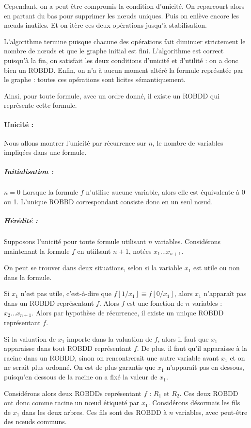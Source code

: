 \documentclass[12pt]{article}
\begin{document}
Cependant, on a peut être compromis la condition d'unicité. On reparcourt alors en partant du bas pour supprimer les n\oe uds uniques. Puis on enlève encore les n\oe uds inutiles. Et on itère ces deux opérations jusqu'à stabilisation.

L'algorithme termine puisque chacune des opérations fait diminuer strictement le nombre de n\oe uds et que le graphe initial est fini.
L'algorithme est correct puisqu'à la fin, on satisfait les deux conditions d'unicité et d'utilité : on a donc bien un ROBDD. Enfin, on n'a à aucun moment altéré la formule représntée par le graphe : toutes ces opérations sont licites sémantiquement. %

Ainsi, pour toute formule, avec un ordre donné, il existe un ROBDD qui représente cette formule.

\paragraph{Unicité :}
Nous allons montrer l'unicité par récurrence sur $n$, le nombre de variables impliqées dans une formule.

\subparagraph{Initialisation :}
$n = 0$ Lorsque la formule $f$ n'utilise aucune variable, alors elle est équivalente à 0 ou 1. L'unique ROBBD correspondant consiste donc en un seul n\oe ud.

\subparagraph{Hérédité :}
Supposons l'unicité pour toute formule utilisant $n$ variables. Considérons maintenant la formule $f$ en utiilsant $n+1$, notées $x_1\dots x_{n+1}$.

On peut se trouver dans deux situations, selon si la variable $x_1$ est utile ou non dans la formule.

Si $x_1$ n'est pas utile, c'est-à-dire que $f[1/x_1]\equiv f[0/x_1]$, alors $x_1$ n'apparaît pas dans un ROBDD représentant $f$. Alors $f$ est une fonction de $n$ variables : $x_2\dots x_{n+1}$. Alors par hypothèse de récurrence, il existe un unique ROBDD représentant $f$.

Si la valuation de $x_1$ importe dans la valuation de $f$, alors il faut que $x_1$ apparaisse dans tout ROBDD représentant $f$. De plus, il faut qu'il apparaisse à la racine dans un ROBDD, sinon on rencontrerait une autre variable avant $x_1$ et on ne serait plus ordonné. On est de plus garantis que $x_1$ n'apparaît pas en dessous, puisqu'en dessous de la racine on a fixé la valeur de $x_1$.

Considérons alors deux ROBDDs représentant $f$ : $R_1$ et $R_2$. Ces deux ROBDD ont donc comme racine un n\oe ud étiqueté par $x_1$. Considérons désormais les fils de $x_1$ dans les deux arbres. Ces fils sont des ROBDD à $n$ variables, avec peut-être des n\oe uds communs.
\end{document}
